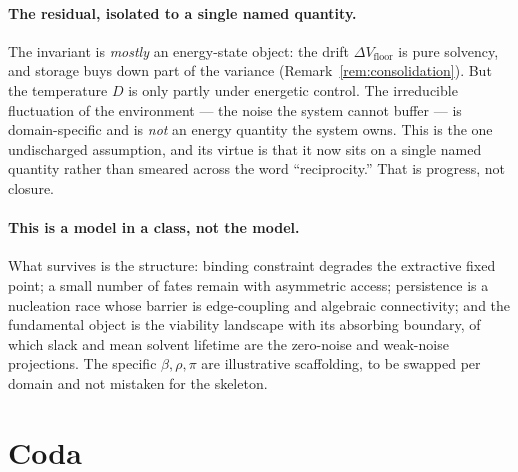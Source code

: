 \documentclass[11pt]{article}
\theoremstyle{plain}
\theoremstyle{definition}
\begin{document}
\paragraph{The residual, isolated to a single named quantity.} The invariant is \emph{mostly} an energy-state object: the drift $\Delta V_{\text{floor}}$ is pure solvency, and storage buys down part of the variance (Remark~\ref{rem:consolidation}). But the temperature $D$ is only partly under energetic control. The irreducible fluctuation of the environment --- the noise the system cannot buffer --- is domain-specific and is \emph{not} an energy quantity the system owns. This is the one undischarged assumption, and its virtue is that it now sits on a single named quantity rather than smeared across the word ``reciprocity.'' That is progress, not closure.

\paragraph{This is a model in a class, not the model.} What survives is the structure: binding constraint degrades the extractive fixed point; a small number of fates remain with asymmetric access; persistence is a nucleation race whose barrier is edge-coupling and algebraic connectivity; and the fundamental object is the viability landscape with its absorbing boundary, of which slack and mean solvent lifetime are the zero-noise and weak-noise projections. The specific $\beta,\rho,\pi$ are illustrative scaffolding, to be swapped per domain and not mistaken for the skeleton.

\section{Coda}
\end{document}
